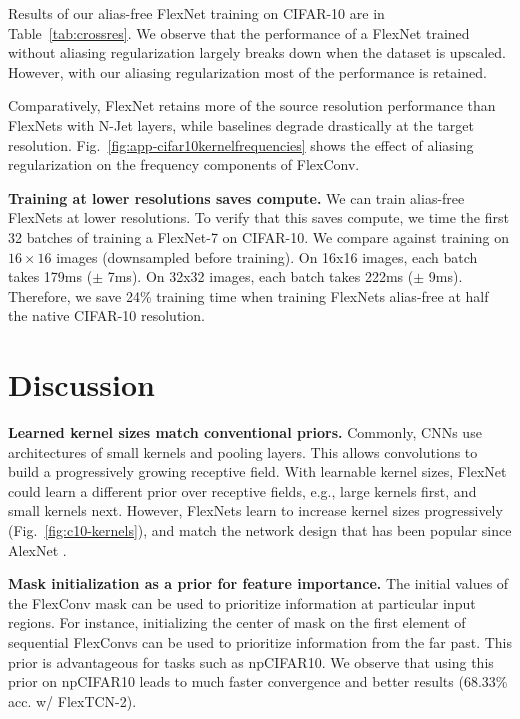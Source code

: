 \documentclass{article} \usepackage{iclr2022_conference,times}
\begin{document}
Results of our alias-free FlexNet training on CIFAR-10 are in Table~\ref{tab:crossres}. We observe that the performance of a FlexNet trained without aliasing regularization largely breaks down when the dataset is upscaled. 
However, with our aliasing regularization most of the performance is retained. 

Comparatively, FlexNet retains more of the source resolution performance than FlexNets with N-Jet layers, while baselines degrade drastically at the target resolution. Fig.~\ref{fig:app-cifar10kernelfrequencies} shows the effect of aliasing regularization on the frequency components of FlexConv.

\textbf{Training at lower resolutions saves compute.} We can train alias-free FlexNets at lower resolutions. To verify that this saves compute, we time the first 32 batches of training a FlexNet-7 on CIFAR-10. We compare against training on $16 \times 16$ images (downsampled before training). On 16x16 images, each batch takes 179ms ($\pm$ 7ms). On 32x32 images, each batch takes 222ms ($\pm$ 9ms). Therefore, we save 24\% training time when training FlexNets alias-free at half the native CIFAR-10 resolution.
\vspace{-2mm}
\section{Discussion}
\label{sec:discussion}
\vspace{-2mm}
\textbf{Learned kernel sizes match conventional priors.} Commonly, CNNs use architectures of small kernels and pooling layers. This allows convolutions to build a progressively growing receptive field. With learnable kernel sizes, FlexNet could learn a different prior over receptive fields, e.g., large kernels first, and small kernels next. However, FlexNets learn to increase kernel sizes progressively (Fig.~\ref{fig:c10-kernels}), and match the network design that has been popular since AlexNet \citep{krizhevsky_imagenet_2012}.

\textbf{Mask initialization as a prior for feature importance.} The initial values of the FlexConv mask can be used to prioritize information at particular input regions. For instance, initializing the center of mask on the first element of sequential FlexConvs can be used to prioritize information from the far past. This prior is advantageous for tasks such as npCIFAR10. We observe that using this prior on npCIFAR10 leads to much faster convergence and better results (68.33\% acc. w/ FlexTCN-2).
\end{document}
